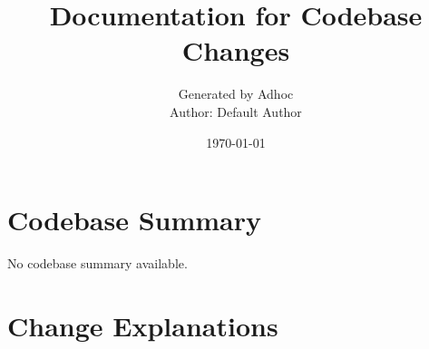 \documentclass{article}
\title{\textbf{Documentation for Codebase Changes}}
\author{Generated by Adhoc \\ Author: Default Author}
\date{\today}
\begin{document}
\maketitle

\section*{Codebase Summary}
No codebase summary available.

\newpage

\section*{Change Explanations}
\end{document}

